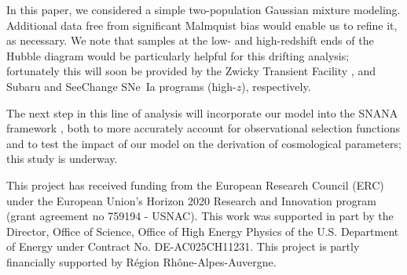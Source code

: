 \documentclass[]{aa}
\begin{document}
In this paper, we considered a simple two-population Gaussian mixture
modeling. Additional data free from significant Malmquist bias would enable
us to refine it, as necessary. We note that samples at the low- and high-redshift
ends of the Hubble diagram would be particularly helpful for this drifting
analysis; fortunately this will soon be provided by the Zwicky Transient
Facility \citep[low-$z$,][]{bellm2019, graham2019}, and Subaru and SeeChange
SNe~Ia programs (high-$z$), respectively. 

The next step in this line of analysis will incorporate our model into
the SNANA framework \citep{SNANA}, both to more accurately account for
observational selection functions and to test the impact of our model on the
derivation of cosmological parameters; this study is underway.

\begin{acknowledgements}
    This project has received funding from the European Research Council (ERC)
    under the European Union's Horizon 2020 Research and Innovation program
    (grant agreement no 759194 - USNAC).
    This work was supported in part by the Director, Office of Science, Office
    of High Energy Physics of the U.S. Department of Energy under Contract No.
    DE-AC025CH11231.
    This project is partly financially supported by Région Rhône-Alpes-Auvergne.
\end{acknowledgements}
\end{document}

